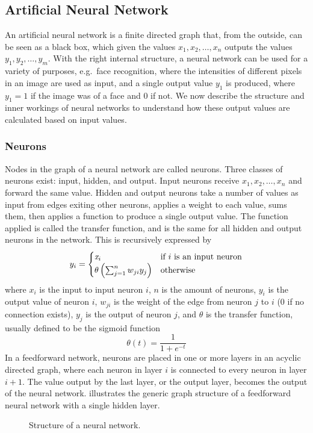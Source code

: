 \subsection{Artificial Neural Network}
An artificial neural network is a finite directed graph that, from the outside, can be seen as a black box, which given the values $x_1, x_2, \dots, x_n$ outputs the values $y_1, y_2, \dots, y_m$. With the right internal structure, a neural network can be used for a variety of purposes, e.g.\ face recognition, where the intensities of different pixels in an image are used as input, and a single output value $y_1$ is produced, where $y_1 = 1$ if the image was of a face and $0$ if not. We now describe the structure and inner workings of neural networks to understand how these output values are calculated based on input values.

\subsubsection{Neurons}
Nodes in the graph of a neural network are called neurons. Three classes of neurons exist: input, hidden, and output. Input neurons receive $x_1, x_2, \dots, x_n$ and forward the same value. Hidden and output neurons take a number of values as input from edges exiting other neurons, applies a weight to each value, sums them, then applies a function to produce a single output value. The function applied is called the transfer function, and is the same for all hidden and output neurons in the network. This is recursively expressed by 
\begin{equation*}\label{eq:weightcalc}
  y_i =
  \begin{cases}
    \var{x}_i                     & \text{if } i \text{ is an input neuron} \\
    \theta\left(\sum_{j=1}^n w_{ji} y_{j} \right) & \text{otherwise} %
  \end{cases}
\end{equation*}
%
where $x_i$ is the input to input neuron $i$, $n$ is the amount of neurons, $y_i$ is the output value of neuron $i$, $w_{ji}$ is the weight of the edge from neuron $j$ to $i$ ($0$ if no connection exists), $y_j$ is the output of neuron $j$, and $\theta$ is the transfer function, usually defined to be the sigmoid function
%
\begin{equation*}
  \theta(t) = \frac{1}{1+e^{-t}}
\end{equation*}
%
In a feedforward network, neurons are placed in one or more layers in an acyclic directed graph, where each neuron in layer $i$ is connected to every neuron in layer $i + 1$. The value output by the last layer, or the output layer, becomes the output of the neural network.  illustrates the generic graph structure of a feedforward neural network with a single hidden layer.
%
\begin{figure}[htpb]
  \centering
  \caption{Structure of a neural network.}
  \label{fig:ann}
\end{figure}
%

